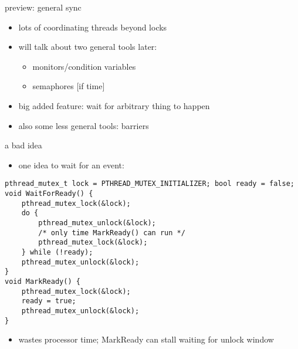 \begin{frame}{preview: general sync}
    \begin{itemize}
    \item lots of coordinating threads beyond locks
    \item will talk about two general tools later:
        \begin{itemize}
        \item monitors/condition variables
        \item semaphores [if time]
        \end{itemize}
    \item big added feature: wait for arbitrary thing to happen
    \vspace{.5cm}
    \item also some less general tools: barriers
    \end{itemize}
\end{frame}

\begin{frame}[fragile]{a bad idea}
\begin{itemize}
\item one  idea to wait for an event:
\end{itemize}
\begin{lstlisting}[style=size105]
pthread_mutex_t lock = PTHREAD_MUTEX_INITIALIZER; bool ready = false;
void WaitForReady() {
    pthread_mutex_lock(&lock);
    do {
        pthread_mutex_unlock(&lock);
        /* only time MarkReady() can run */
        pthread_mutex_lock(&lock);
    } while (!ready);
    pthread_mutex_unlock(&lock);
}
void MarkReady() {
    pthread_mutex_lock(&lock);
    ready = true;
    pthread_mutex_unlock(&lock);
}
\end{lstlisting}
\begin{itemize}
\item wastes processor time; MarkReady can stall waiting for unlock window
\end{itemize}
\end{frame}
